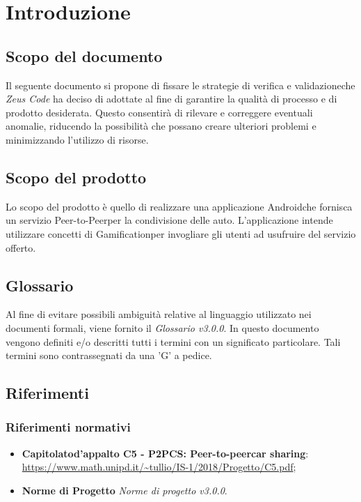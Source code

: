 \section{Introduzione}
\subsection{Scopo del documento}
Il seguente documento si propone di fissare le strategie di verifica e validazione\glosp che \textit{Zeus Code} ha deciso di adottate al fine di garantire la qualità di processo e di prodotto desiderata. \newline
Questo consentirà di rilevare e correggere eventuali anomalie, riducendo la possibilità che possano creare ulteriori problemi e minimizzando l'utilizzo di risorse. 
\subsection{Scopo del prodotto}
Lo scopo del prodotto è quello di realizzare una applicazione Android\glosp che fornisca un servizio Peer-to-Peer\glosp per la condivisione delle auto. L'applicazione intende utilizzare concetti di Gamification\glosp per invogliare gli utenti ad usufruire del servizio offerto.
\subsection{Glossario}
Al fine di evitare possibili ambiguità relative al linguaggio utilizzato nei documenti formali, viene fornito il \textit{Glossario v3.0.0}. In questo documento vengono definiti e/o descritti tutti i termini con un significato particolare. Tali termini sono contrassegnati da una 'G' a pedice.
\subsection{Riferimenti}
\subsubsection{Riferimenti normativi}
\begin{itemize}

\item \textbf{Capitolato\glosp d'appalto C5 - P2PCS: Peer-to-peer\glosp car sharing}: \\ \url{https://www.math.unipd.it/~tullio/IS-1/2018/Progetto/C5.pdf};
\item \textbf{Norme di Progetto} \textit{Norme di progetto v3.0.0}.
\end{itemize}
